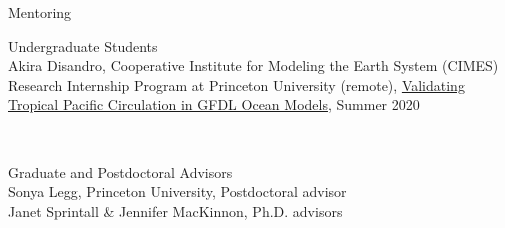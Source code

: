 \documentclass{resume} %
\begin{document}
\begin{rSection}{Mentoring}
\begin{rSubsectionW}{Undergraduate Students}
\\Akira Disandro, Cooperative Institute for Modeling the Earth System (CIMES) Research Internship Program at Princeton University (remote), \href{https://github.com/disandroa/GFDL_Notebooks}{Validating Tropical Pacific Circulation in GFDL Ocean Models}, Summer 2020
\end{rSubsectionW}
\\
\begin{rSubsectionW}{Graduate and Postdoctoral Advisors}
\\Sonya Legg, Princeton University, Postdoctoral advisor\\
Janet Sprintall \& Jennifer MacKinnon, Ph.D. advisors
\end{rSubsectionW}
\end{rSection}
\end{document}
